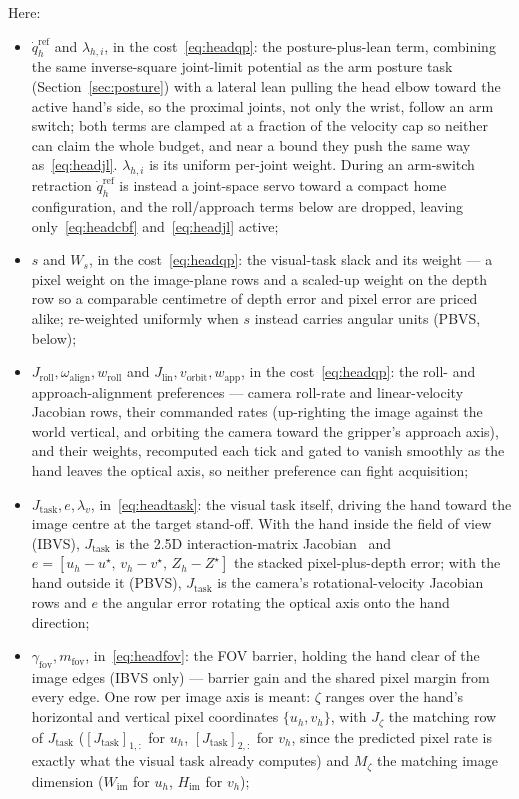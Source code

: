 \documentclass[12pt,a4paper,twoside,openright]{report}
\newcommand{\qdot}{\dot{q}}
\begin{document}
Here:
\begin{itemize}[nosep]
\item $\qdot_h^{\text{ref}}$ and $\lambda_{h,i}$, in the cost~\eqref{eq:headqp}: the posture-plus-lean term, combining the same inverse-square joint-limit potential as the arm posture task (Section~\ref{sec:posture}) with a lateral lean pulling the head elbow toward the active hand's side, so the proximal joints, not only the wrist, follow an arm switch; both terms are clamped at a fraction of the velocity cap so neither can claim the whole budget, and near a bound they push the same way as~\eqref{eq:headjl}. $\lambda_{h,i}$ is its uniform per-joint weight. During an arm-switch retraction $\qdot_h^{\text{ref}}$ is instead a joint-space servo toward a compact home configuration, and the roll/approach terms below are dropped, leaving only~\eqref{eq:headcbf} and~\eqref{eq:headjl} active;
\item $s$ and $W_s$, in the cost~\eqref{eq:headqp}: the visual-task slack and its weight --- a pixel weight on the image-plane rows and a scaled-up weight on the depth row so a comparable centimetre of depth error and pixel error are priced alike; re-weighted uniformly when $s$ instead carries angular units (PBVS, below);
\item $J_{\text{roll}}, \omega_{\text{align}}, w_{\text{roll}}$ and $J_{\text{lin}}, v_{\text{orbit}}, w_{\text{app}}$, in the cost~\eqref{eq:headqp}: the roll- and approach-alignment preferences --- camera roll-rate and linear-velocity Jacobian rows, their commanded rates (up-righting the image against the world vertical, and orbiting the camera toward the gripper's approach axis), and their weights, recomputed each tick and gated to vanish smoothly as the hand leaves the optical axis, so neither preference can fight acquisition;
\item $J_{\text{task}}, e, \lambda_v$, in~\eqref{eq:headtask}: the visual task itself, driving the hand toward the image centre at the target stand-off. With the hand inside the field of view (IBVS), $J_{\text{task}}$ is the 2.5D interaction-matrix Jacobian~\cite{malis1999,chaumette2006} and $e = [u_h-u^{\star},\,v_h-v^{\star},\,Z_h-Z^{\star}]$ the stacked pixel-plus-depth error; with the hand outside it (PBVS), $J_{\text{task}}$ is the camera's rotational-velocity Jacobian rows and $e$ the angular error rotating the optical axis onto the hand direction;
\item $\gamma_{\text{fov}}, m_{\text{fov}}$, in~\eqref{eq:headfov}: the FOV barrier, holding the hand clear of the image edges (IBVS only) --- barrier gain and the shared pixel margin from every edge. One row per image axis is meant: $\zeta$ ranges over the hand's horizontal and vertical pixel coordinates $\{u_h, v_h\}$, with $J_{\zeta}$ the matching row of $J_{\text{task}}$ ($[J_{\text{task}}]_{1,:}$ for $u_h$, $[J_{\text{task}}]_{2,:}$ for $v_h$, since the predicted pixel rate is exactly what the visual task already computes) and $M_{\zeta}$ the matching image dimension ($W_{\text{im}}$ for $u_h$, $H_{\text{im}}$ for $v_h$);

\end{itemize}
\end{document}
